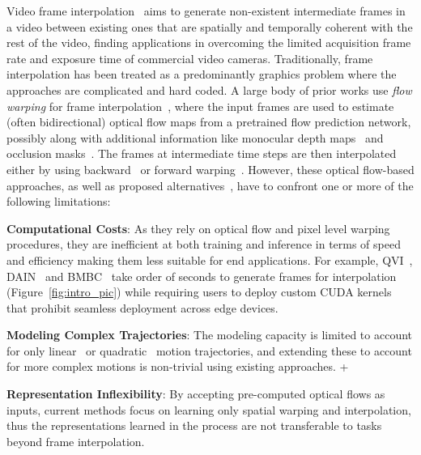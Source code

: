 \documentclass[10pt,twocolumn,letterpaper]{article}
\newcommand{\figref}[1]{Figure~\ref{#1}}
\newcommand{\red}[1]{{#1}}
\newcommand{\eightx}{}
\begin{document}
Video frame interpolation~\cite{meyer2018phasenet, bao2019depth, xue2019video, lee2020adacof, jiang2018super, niklaus2017video, niklaus2018context, liu2017video, choi2020channel, niklaus2020softmax} aims to generate non-existent intermediate frames in a video between existing ones that are spatially and temporally coherent with the rest of the video, finding applications in overcoming the limited acquisition frame rate and exposure time of commercial video cameras.
Traditionally, frame interpolation has been treated as a predominantly graphics problem where the approaches are complicated and hard coded. A large body of prior works use \textit{flow warping} for frame interpolation~\cite{jiang2018super, xue2019video, niklaus2020softmax}, where the input frames are used to estimate (often bidirectional) optical flow maps from a pretrained flow prediction network, possibly along with additional information like monocular depth maps~\cite{bao2019depth} and occlusion masks~\cite{bao2019memc}. The frames at intermediate time steps are then interpolated either by using backward~\cite{jiang2018super, bao2019depth} or forward warping~\cite{niklaus2018context, niklaus2020softmax}. However, these optical flow-based approaches, as well as proposed alternatives~\cite{niklaus2017video, niklaus2017video_2, peleg2019net, cheng2020video, lee2020adacof}, have to confront one or more of the following limitations:
\begin{enumerate*}
    \item{\bf Computational Costs}: As they rely on optical flow and pixel level warping procedures, they are inefficient at both training and inference in terms of speed and efficiency making them less suitable for end applications. \red{For example, QVI~\cite{xu2019quadratic}, DAIN~\cite{bao2019depth} and BMBC~\cite{park2020bmbc} take order of seconds to generate frames for \eightx interpolation (\figref{fig:intro_pic}) while requiring users to deploy custom CUDA kernels that prohibit seamless deployment across edge devices.}
    
    \item{\bf Modeling Complex Trajectories}: The modeling capacity is limited to account for only linear~\cite{jiang2018super, bao2019depth} or quadratic~\cite{xu2019quadratic, chi2020all} motion trajectories, and extending these to account for more complex motions is non-trivial using existing approaches. 
    +
    \item{\bf Representation Inflexibility}: By accepting pre-computed optical flows as inputs, current methods focus on learning only spatial warping and interpolation, thus the representations learned in the process are not transferable to tasks beyond frame interpolation. 

\end{enumerate*}
\end{document}
